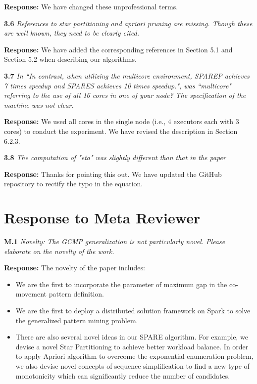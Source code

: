 \documentclass{vldb}
\begin{document}
\textbf{Response:} We have changed these unprofessional terms.



\textbf{3.6} \emph{References to star partitioning and apriori pruning are missing. Though these
are well known, they need to  be clearly cited.}

\textbf{Response:} We have added the corresponding references in Section 5.1 and Section 5.2 when describing our algorithms.

\textbf{3.7} \emph{In ``In contrast, when utilizing the multicore
environment, SPAREP achieves 7 times speedup and SPARES achieves 10 times speedup.", was ``multicore"
referring to the use of all 16 cores in one of your node? The specification of the machine was not clear.}

\textbf{Response:} We used all cores in the single node (i.e., 4 executors each with 3 cores) to conduct the experiment. We have revised the description in Section 6.2.3.



\textbf{3.8} \emph{The computation of "eta" was slightly different than that in the paper}

\textbf{Response:} Thanks for pointing this out. We have updated the GitHub repository to rectify the typo in the equation.













\section{Response to Meta Reviewer}

\textbf{M.1} \emph{Novelty: The GCMP generalization is not particularly novel. Please elaborate on the novelty of the work.}

\textbf{Response:} The novelty of the paper includes:
\begin{itemize}
\item We are the first to incorporate the parameter of maximum gap in the co-movement pattern definition.

\item We are the first to deploy a distributed solution framework on Spark to solve the generalized pattern mining problem.

\item There are also several novel ideas in our SPARE algorithm. For example, we devise a novel Star Partitioning to achieve better workload balance. In order to apply Apriori algorithm to overcome the exponential enumeration problem, we also devise novel concepts of sequence simplification to find a new type of monotonicity which can significantly reduce the number of candidates. 
\end{itemize}
\end{document}
